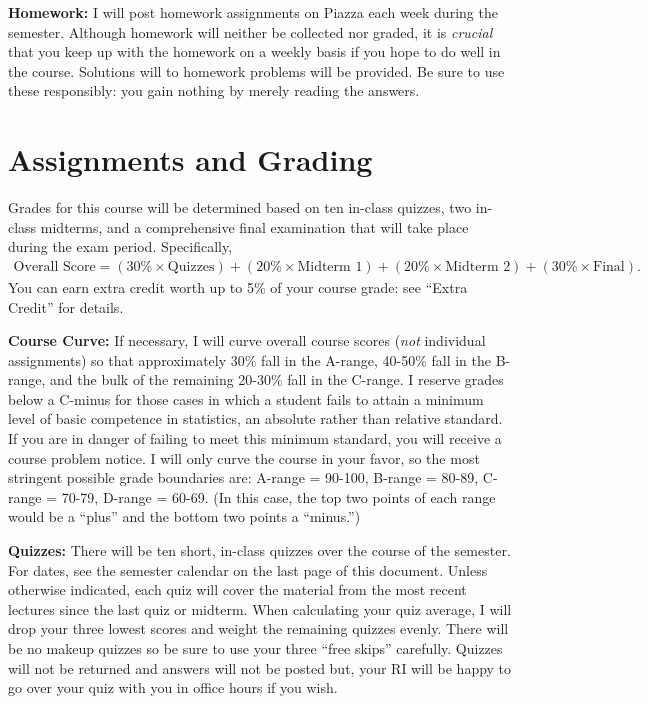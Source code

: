 \documentclass[11pt, letterpaper]{article}
\begin{document}
\medskip

\noindent \textbf{Homework:} 
I will post homework assignments on Piazza each week during the semester.
Although homework will neither be collected nor graded, it is \emph{crucial} that you keep up with the homework on a weekly basis if you hope to do well in the course.
Solutions will to homework problems will be provided.
Be sure to use these responsibly: you gain nothing by merely reading the answers. 



\section*{Assignments and Grading}

Grades for this course will be determined based on ten in-class quizzes, two in-class midterms, and a comprehensive final examination that will take place during the exam period.
Specifically,
	\begin{equation*}
	\begin{split}
		\mbox{Overall Score} = (30\% \times \mbox{Quizzes})  + (20\% \times \mbox{Midterm 1}) + (20\% \times \mbox{Midterm 2}) + (30\% \times \mbox{Final}).
	\end{split}
	\end{equation*}
You can earn extra credit worth up to 5\% of your course grade: see ``Extra Credit'' for details.

\medskip 

\noindent \textbf{Course Curve:}
If necessary, I will curve overall course scores (\emph{not} individual assignments) so that approximately 30\% fall in the A-range, 40-50\% fall in the B-range, and the bulk of the remaining 20-30\% fall in the C-range. 
I reserve grades below a C-minus for those cases in which a student fails to attain a minimum level of basic competence in statistics, an absolute rather than relative standard. 
If you are in danger of failing to meet this minimum standard, you will receive a course problem notice.
I will only curve the course in your favor, so the most stringent possible grade boundaries are: A-range = 90-100, B-range = 80-89, C-range = 70-79, D-range = 60-69.
(In this case, the top two points of each range would be a ``plus'' and the bottom two points a ``minus.'')

\medskip


\noindent \textbf{Quizzes:} 
There will be ten short, in-class quizzes over the course of the semester.
For dates, see the semester calendar on the last page of this document.
Unless otherwise indicated, each quiz will cover the material from the most recent lectures since the last quiz or midterm.
When calculating your quiz average, I will drop your three lowest scores and weight the remaining quizzes evenly. 
There will be no makeup quizzes so be sure to use your three ``free skips'' carefully.
Quizzes will not be returned and answers will not be posted but, your RI will be happy to go over your quiz with you in office hours if you wish. 
\end{document}
